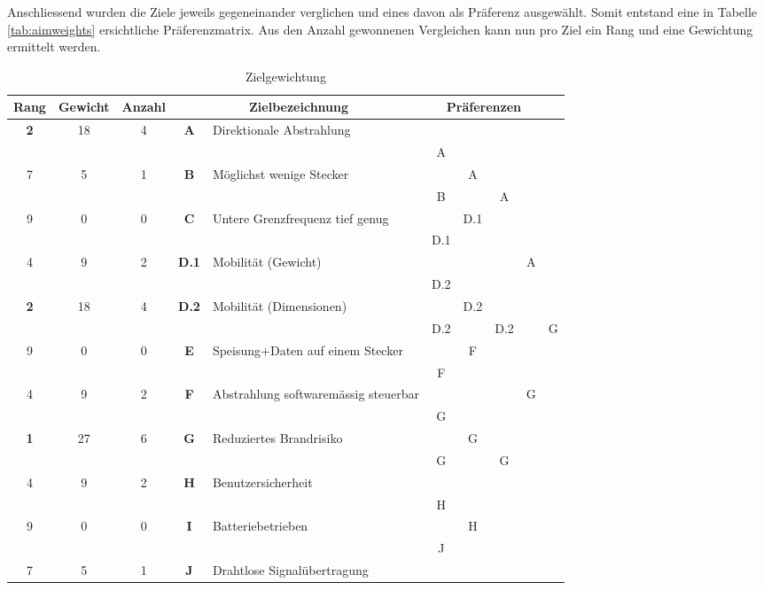 Anschliessend wurden die Ziele jeweils gegeneinander verglichen und eines davon als Präferenz ausgewählt. Somit entstand eine in Tabelle \ref{tab:aimweights} ersichtliche Präferenzmatrix. Aus den Anzahl gewonnenen Vergleichen kann nun pro Ziel ein Rang und eine Gewichtung ermittelt werden.
\begin{table}[H]
	\centering
	\begin{tabularx}{\textwidth}{cccclccccc}
		\toprule
		\textbf{Rang} & \textbf{Gewicht} & \textbf{Anzahl} & \multicolumn{2}{c}{\textbf{Zielbezeichnung}} & \multicolumn{4}{c}{\textbf{Präferenzen}} \\ \midrule
		\textbf{2} & 18 & 4 & \textbf{A} & Direktionale Abstrahlung & ~ & ~ & ~ & ~ & ~ \\ 
		\textbf{} & ~ & ~ & ~ & ~ & A & ~ & ~ & ~ & ~ \\ 
		7 & 5 & 1 & \textbf{B} & Möglichst wenige Stecker & ~ & A & ~ & ~ & ~ \\ 
		\textbf{} & ~ & ~ & ~ & ~ & B & ~ & A & ~ & ~ \\ 
		9 & 0 & 0 & \textbf{C} & Untere Grenzfrequenz tief genug & ~ & D.1 & ~ & ~ & ~ \\ 
		\textbf{} & ~ & ~ & ~ & ~ & D.1 & ~ & ~ & ~ & ~ \\ 
		4 & 9 & 2 & \textbf{D.1} & Mobilität (Gewicht) & ~ & ~ & ~ & A & ~ \\ 
		\textbf{} & ~ & ~ & ~ & ~ & D.2 & ~ & ~ & ~ & ~ \\ 
		\textbf{2} & 18 & 4 & \textbf{D.2} & Mobilität (Dimensionen) & ~ & D.2 & ~ & ~ & ~ \\ 
		\textbf{} & ~ & ~ & ~ & ~ & D.2 & ~ & D.2 & ~ & G \\ 
		9 & 0 & 0 & \textbf{E} & Speisung+Daten auf einem Stecker & ~ & F & ~ & ~ & ~ \\ 
		\textbf{} & ~ & ~ & ~ & ~ & F & ~ & ~ & ~ & ~ \\ 
		4 & 9 & 2 & \textbf{F} & Abstrahlung softwaremässig steuerbar & ~ & ~ & ~ & G & ~ \\ 
		\textbf{} & ~ & ~ & ~ & ~ & G & ~ & ~ & ~ & ~ \\ 
		\textbf{1} & 27 & 6 & \textbf{G} & Reduziertes Brandrisiko & ~ & G & ~ & ~ & ~ \\ 
		\textbf{} & ~ & ~ & ~ & ~ & G & ~ & G & ~ & ~ \\ 
		4 & 9 & 2 & \textbf{H} & Benutzersicherheit & ~ & ~ & ~ & ~ & ~ \\ 
		\textbf{} & ~ & ~ & ~ & ~ & H & ~ & ~ & ~ & ~ \\ 
		9 & 0 & 0 & \textbf{I} &  Batteriebetrieben & ~ & H & ~ & ~ & ~ \\ 
		\textbf{} & ~ & ~ & ~ & ~ & J & ~ & ~ & ~ & ~ \\ 
		7 & 5 & 1 & \textbf{J} &  Drahtlose Signalübertragung & ~ & ~ & ~ & ~ & ~ \\ 
		\bottomrule
	\end{tabularx}
	\caption{Zielgewichtung}
	\label{tab:zielgewichtung}
\end{table}
